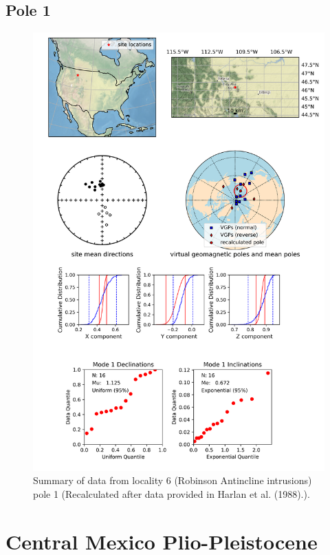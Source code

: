 \subsection{Pole 1}


\begin{figure}[H]
\centering
\includegraphics[width=5 in]{./6/1/pole_summary.png}
\caption{Summary of data from locality 6 (Robinson Antincline intrusions) pole 1 (Recalculated after data provided in Harlan et al. (1988).).}
\end{figure}

\section{Central Mexico Plio-Pleistocene}
